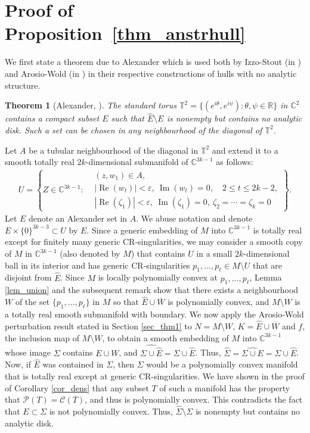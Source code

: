 \documentclass[10pt]{amsart}
\numberwithin{equation}{section}
\theoremstyle{definition}
\theoremstyle{definition}
\theoremstyle{plain}
\newtheorem{theorem}{Theorem}[section]
\newcommand{\beas}{\begin{eqnarray*}}
\newcommand{\eeas}{\end{eqnarray*}}
\newcommand{\eps}{\varepsilon}
\newcommand{\zt}{\zeta}
\newcommand{\cont}{\mathcal{C}}
\newcommand{\rea}{\operatorname{Re}}
\newcommand{\ima}{\operatorname{Im}}
\newcommand{\CC}{\mathbb{C}^2}
\newcommand{\C} {\mathbb{C}}
\newcommand{\rl}{\mathbb{R}}
\begin{document}
\section{Proof of Proposition~\ref{thm_anstrhull}}
We first state a theorem due to Alexander which is used both by Izzo-Stout (in \cite{IzSt18}) and Arosio-Wold (in \cite{ArWo17}) in their respective constructions of hulls with no analytic structure. 

\begin{theorem}[Alexander, \cite{Al98}]  The standard torus $\mathbb{T}^2=\{(e^{i\theta},e^{i\psi}):\theta,\psi\in\rl\}$ in $\CC$ contains a compact subset $E$ such that $\widehat E\setminus E$ is nonempty but contains no analytic disk. Such a set can be chosen in any neighbourhood of the diagonal of $\mathbb{T}^2$.  
\end{theorem}

Let $A$ be a tubular neighbourhood of the diagonal in $\mathbb{T}^2$ and extend it to a smooth totally real $2k$-dimensional submanifold of $\C^{3k-1}$ as follows:
	\beas
			U=
\left\{Z\in\C^{3k-1}:
\begin{aligned}
&(z,w_1)\in A,\\
& |\rea(w_t)|<\eps,\ \ima(w_t)=0,\quad 2\leq t\leq 2k-2,\\
& |\rea(\zeta_1)|<\eps,\ \ima(\zeta_1)=0,\ \zt_2=\cdots=\zeta_k=0
\end{aligned}
\right\}.
	\eeas
Let $E$ denote an Alexander set in $A$. We abuse notation and denote $E\times\{0\}^{3k-3}\subset U$ by $E$. Since a generic embedding of $M$ into $\C^{3k-1}$ is totally real except for finitely many generic CR-singularities, we may consider a smooth copy of $M$ in $\C^{3k-1}$ (also denoted by $M$) that contains $U$ in a small $2k$-dimensional ball in its interior and has generic CR-singularities $p_1,...,p_\ell\in M\setminus U$ that are disjoint from $\widehat E$. Since $M$ is locally polynomially convex at $p_1,...,p_\ell$, Lemma \ref{lem_union} and the subsequent remark show that there exists a neighbourhood $W$ of the set $\{p_1,...,p_\ell\}$ in $M$ so that $\widehat E\cup \overline W$ is polynomially convex, and $M\setminus W$ is a totally real smooth submanifold with boundary. We now apply the Arosio-Wold perturbation result stated in Section \ref{sec_thm1} to $N=M\setminus W$, $K=\widehat E\cup\overline W$ and $f$, the inclusion map of $M\setminus W$, to obtain a smooth embedding of $M$ into $\C^{3k-1}$ whose image $\Sigma$ contains $E\cup W$, and $\widehat{\Sigma\cup \widehat E}= \Sigma\cup\widehat E$. Thus, $\widehat{\Sigma}=\widehat{\Sigma\cup E}= \Sigma\cup\widehat E$. Now, if $\widehat E$ was contained in $\Sigma$, then $\Sigma$ would be a polynomially convex manifold that is totally real except at generic CR-singularities. We have shown in the proof of Corollary \ref{cor_dens} that any subset $T$ of such a manifold has the property that $\mathcal{P}(T)=\cont(T)$, and thus is polynomially convex. This contradicts the fact that $ E\subset \Sigma$ is not polynomially convex. Thus, 
$\widehat\Sigma\setminus\Sigma$ is nonempty but contains no analytic disk. 
\end{document}
